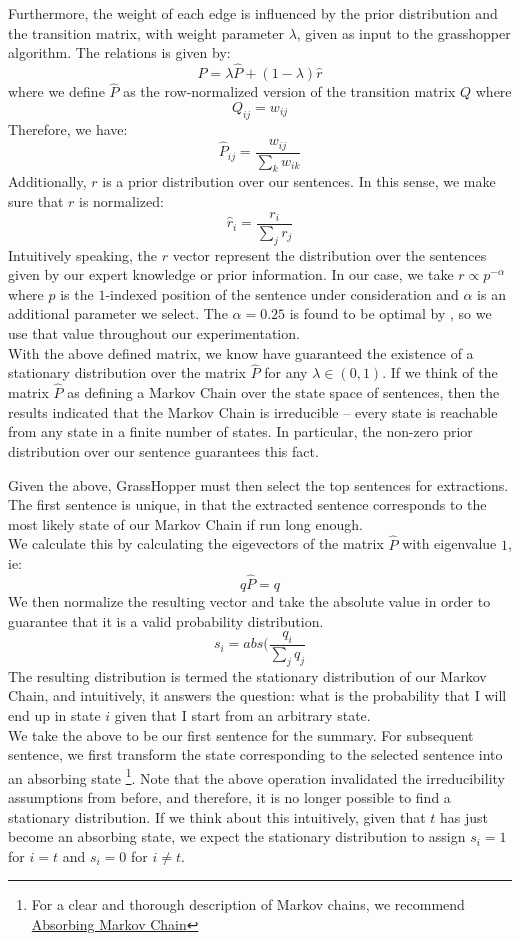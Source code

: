 \documentclass[11pt]{article}
\begin{document}
Furthermore, the weight of each edge is influenced by the prior distribution  and the transition matrix, with weight parameter $\lambda$, given as input to the grasshopper algorithm. The relations is given by:
$$
P = \lambda \hat{P} + (1-\lambda)\hat{r}
$$
where we define $\hat{P}$ as the row-normalized version of the transition matrix $Q$ where
$$
Q_{ij} = w_{ij}
$$
Therefore, we have:
$$
\hat{P}_{ij} = \frac{w_{ij}}{\sum_k w_{ik}}
$$
Additionally, $r$ is a prior distribution over our sentences. In this sense, we make sure that $r$ is normalized:
$$
\hat{r}_i = \frac{r_i}{\sum_j r_j}
$$
Intuitively speaking, the $r$ vector represent the distribution over the sentences given by our expert knowledge or prior information. In our case, we take $r \propto p^{-\alpha}$ where $p$ is the $1$-indexed position of the sentence under consideration and $\alpha$ is an additional parameter we select. The $\alpha = 0.25$ is found to be optimal by \cite{grasshopper}, so we use that value throughout our experimentation. \\

With the above defined matrix, we know have guaranteed the existence of a stationary distribution over the matrix $\hat{P}$ for any $\lambda \in (0,1)$. If we think of the matrix $\hat{P}$ as defining a Markov Chain over the state space of sentences, then the results indicated that the Markov Chain is irreducible -- every state is reachable from any state in a finite number of states. In particular, the non-zero prior distribution over our sentence guarantees this fact.

Given the above, {\sc GrassHopper} must then select the top sentences for extractions. The first sentence is unique, in that the extracted sentence corresponds to the most likely state of our Markov Chain if run long enough.\\

We calculate this by calculating the eigevectors of the matrix $\hat{P}$ with eigenvalue $1$, ie:
$$
q\hat{P} = q
$$
We then normalize the resulting vector and take the absolute value in order to guarantee that it is a valid probability distribution.
$$
s_i = abs(\frac{q_i}{\sum_j q_j}
$$
The resulting distribution is termed the stationary distribution of our Markov Chain, and intuitively, it answers the question: what is the probability that I will end up in state $i$ given that I start from an arbitrary state.\\

We take the above to be our first sentence for the summary. For subsequent sentence, we first transform the state corresponding to the selected sentence into an absorbing state \footnote{For a clear and thorough description of Markov chains, we recommend \href{https://en.wikipedia.org/wiki/Absorbing_Markov_chain}{Absorbing Markov Chain}}. Note that the above operation invalidated the irreducibility assumptions from before, and therefore, it is no longer possible to find a stationary distribution. If we think about this intuitively, given that $t$ has just become an absorbing state, we expect the stationary distribution to assign $s_i = 1 $ for $i =t$ and $s_i = 0$ for $i \neq t$. \\
\end{document}
